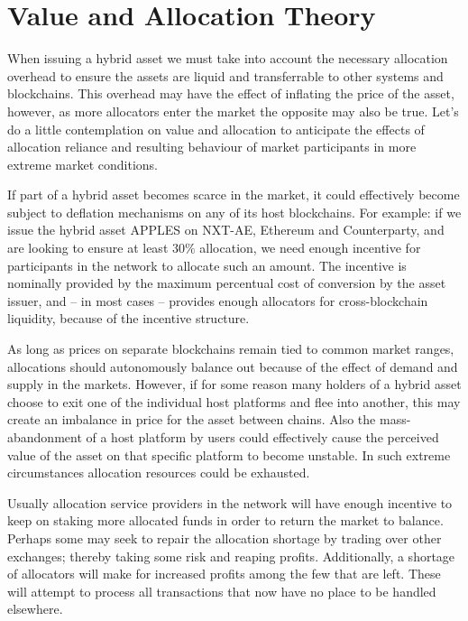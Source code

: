 \documentclass[a4paper]{article}
\begin{document}
\section{Value and Allocation Theory}

When issuing a hybrid asset we must take into account the necessary allocation overhead to ensure the assets are liquid and transferrable to other systems and blockchains. This overhead may have the effect of inflating the price of the asset, however, as more allocators enter the market the opposite may also be true. Let's do a little contemplation on value and allocation to anticipate the effects of allocation reliance and resulting behaviour of market participants in more extreme market conditions.

If part of a hybrid asset becomes scarce in the market, it could effectively become subject to deflation mechanisms on any of its host blockchains. For example: if we issue the hybrid asset APPLES on NXT-AE, Ethereum and Counterparty\cite{counterparty}, and are looking to ensure at least $30\%$ allocation, we need enough incentive for participants in the network to allocate such an amount. The incentive is nominally provided by the maximum percentual cost of conversion by the asset issuer, and – in most cases – provides enough allocators for cross-blockchain liquidity, because of the incentive structure.

As long as prices on separate blockchains remain tied to common market ranges, allocations should autonomously balance out because of the effect of demand and supply in the markets. However, if for some reason many holders of a hybrid asset choose to exit one of the individual host platforms and flee into another, this may create an imbalance in price for the asset between chains. Also the mass-abandonment of a host platform by users could effectively cause the perceived value of the asset on that specific platform to become unstable. In such extreme circumstances allocation resources could be exhausted.

Usually allocation service providers in the \hybridd network will have enough incentive to keep on staking more allocated funds in order to return the market to balance. Perhaps some may seek to repair the allocation shortage by trading over other exchanges; thereby taking some risk and reaping profits. Additionally, a shortage of allocators will make for increased profits among the few that are left. These will attempt to process all transactions that now have no place to be handled elsewhere.
\end{document}

